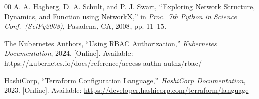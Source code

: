 \documentclass[conference,a4paper]{IEEEtran}
\begin{document}
\begin{thebibliography}{00}
A. A. Hagberg, D. A. Schult, and P. J. Swart,
``Exploring Network Structure, Dynamics, and Function using NetworkX,''
in \textit{Proc.\ 7th Python in Science Conf.\ (SciPy2008)},
Pasadena, CA, 2008, pp. 11--15.

The Kubernetes Authors,
``Using RBAC Authorization,''
\textit{Kubernetes Documentation}, 2024.
[Online]. Available: \url{https://kubernetes.io/docs/reference/access-authn-authz/rbac/}

HashiCorp,
``Terraform Configuration Language,''
\textit{HashiCorp Documentation}, 2023.
[Online]. Available: \url{https://developer.hashicorp.com/terraform/language}

\end{thebibliography}
\end{document}
